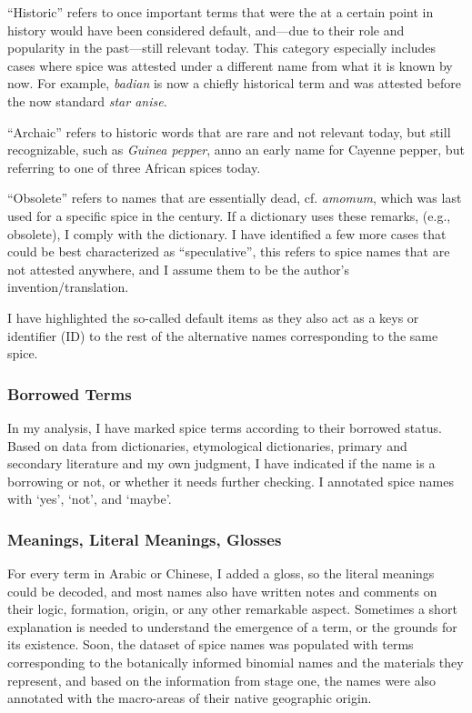 ``Historic'' refers to once important terms that were the at a certain point in history would have been considered default, and---due to their role and popularity in the past---still relevant today. This category especially includes cases where spice was attested under a different name from what it is known by now. For example, \textit{badian} is now a chiefly historical term and was attested before the now standard \textit{star anise}.  

``Archaic'' refers to historic words that are rare and not relevant today, but still recognizable, such as \textit{Guinea pepper}, anno an early name for Cayenne pepper, but referring to one of three African spices today.

``Obsolete'' refers to names that are essentially dead, cf. \textit{amomum}, which was last used for a specific spice in the  century. If a dictionary uses these remarks, (e.g., obsolete), I comply with the dictionary. 
I have identified a few more cases that could be best characterized as ``speculative'', this refers to spice names that are not attested anywhere, and I assume them to be the author's invention/translation. %

I have highlighted the so-called default items as they also act as a keys or identifier (ID) to the rest of the alternative names corresponding to the same spice.

\subsubsection{Borrowed Terms}
\label{sec:borrowed}

In my analysis, I have marked spice terms according to their borrowed status. Based on data from dictionaries, etymological dictionaries, primary and secondary literature and my own judgment, I have indicated if the name is a borrowing or not, or whether it needs further checking. I annotated spice names with `yes', `not', and `maybe'.


\subsubsection{Meanings, Literal Meanings, Glosses}

For every term in Arabic or Chinese, I added a gloss, so the literal meanings could be decoded, and most names also have written notes and comments on their logic, formation, origin, or any other remarkable aspect. Sometimes a short explanation is needed to understand the emergence of a term, or the grounds for its existence. Soon, the dataset of spice names was populated with terms corresponding to the botanically informed binomial names and the materials they represent, and based on the information from stage one, the names were also annotated with the macro-areas of their native geographic origin.

